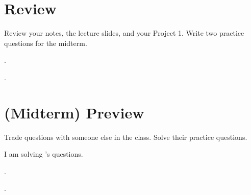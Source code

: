 \documentclass[11pt,letterpaper,boxed]{hmcpset}
\begin{document}
\section*{Review}
Review your notes, the lecture slides, and your Project 1. Write two practice questions for the midterm. 

\begin{problem}
\vspace{9cm}
.
\end{problem}

\begin{problem}
\vspace{9cm}
.
\end{problem}


\pagebreak

\section*{(Midterm) Preview} 
Trade questions with someone else in the class. Solve their practice questions.
\begin{solution}
I am solving \underline{\hspace{5cm}}'s questions.
\end{solution}
\begin{problem}
\vspace{9cm}
.
\end{problem}

\begin{problem}
\vspace{9cm}
.
\end{problem}
\end{document}
